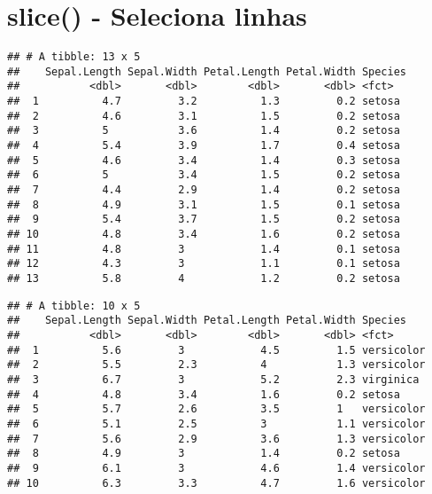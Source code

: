 \documentclass[]{book}
\newenvironment{Shaded}{\begin{snugshade}}{\end{snugshade}}
\newcommand{\DataTypeTok}[1]{\textcolor[rgb]{0.13,0.29,0.53}{#1}}
\newcommand{\DecValTok}[1]{\textcolor[rgb]{0.00,0.00,0.81}{#1}}
\newcommand{\KeywordTok}[1]{\textcolor[rgb]{0.13,0.29,0.53}{\textbf{#1}}}
\newcommand{\NormalTok}[1]{#1}
\newcommand{\OperatorTok}[1]{\textcolor[rgb]{0.81,0.36,0.00}{\textbf{#1}}}
\newcommand{\StringTok}[1]{\textcolor[rgb]{0.31,0.60,0.02}{#1}}
\begin{document}
\hypertarget{slice---seleciona-linhas}{%
\section{slice() - Seleciona linhas}\label{slice---seleciona-linhas}}

\begin{Shaded}
\end{Shaded}

\begin{verbatim}
## # A tibble: 13 x 5
##    Sepal.Length Sepal.Width Petal.Length Petal.Width Species
##           <dbl>       <dbl>        <dbl>       <dbl> <fct>  
##  1          4.7         3.2          1.3         0.2 setosa 
##  2          4.6         3.1          1.5         0.2 setosa 
##  3          5           3.6          1.4         0.2 setosa 
##  4          5.4         3.9          1.7         0.4 setosa 
##  5          4.6         3.4          1.4         0.3 setosa 
##  6          5           3.4          1.5         0.2 setosa 
##  7          4.4         2.9          1.4         0.2 setosa 
##  8          4.9         3.1          1.5         0.1 setosa 
##  9          5.4         3.7          1.5         0.2 setosa 
## 10          4.8         3.4          1.6         0.2 setosa 
## 11          4.8         3            1.4         0.1 setosa 
## 12          4.3         3            1.1         0.1 setosa 
## 13          5.8         4            1.2         0.2 setosa
\end{verbatim}

\begin{Shaded}
\end{Shaded}

\begin{verbatim}
## # A tibble: 10 x 5
##    Sepal.Length Sepal.Width Petal.Length Petal.Width Species   
##           <dbl>       <dbl>        <dbl>       <dbl> <fct>     
##  1          5.6         3            4.5         1.5 versicolor
##  2          5.5         2.3          4           1.3 versicolor
##  3          6.7         3            5.2         2.3 virginica 
##  4          4.8         3.4          1.6         0.2 setosa    
##  5          5.7         2.6          3.5         1   versicolor
##  6          5.1         2.5          3           1.1 versicolor
##  7          5.6         2.9          3.6         1.3 versicolor
##  8          4.9         3            1.4         0.2 setosa    
##  9          6.1         3            4.6         1.4 versicolor
## 10          6.3         3.3          4.7         1.6 versicolor
\end{verbatim}
\end{document}
